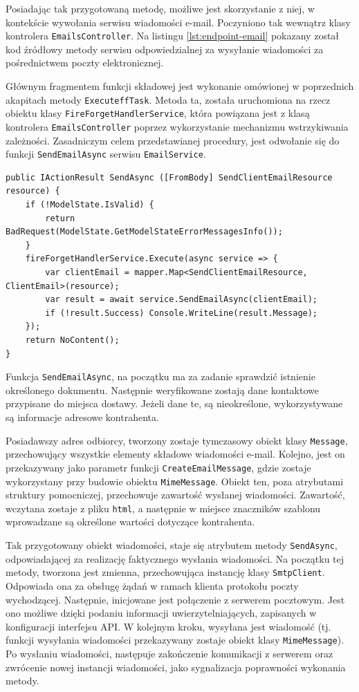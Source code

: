Posiadając tak przygotowaną metodę, możliwe jest skorzystanie z niej, w kontekście wywołania serwisu wiadomości e-mail. Poczyniono tak wewnątrz klasy kontrolera \texttt{EmailsController}. Na listingu \ref{lst:endpoint-email} pokazany został kod źródłowy metody serwisu odpowiedzialnej za wysyłanie wiadomości za pośrednictwem poczty elektronicznej.

Głównym fragmentem funkcji składowej jest wykonanie omówionej w poprzednich akapitach metody \texttt{ExecuteffTask}. Metoda ta, została uruchomiona na rzecz obiektu klasy \texttt{FireForgetHandlerService}, która powiązana jest z klasą kontrolera \texttt{EmailsController} poprzez wykorzystanie mechanizmu wstrzykiwania zależności. Zasadniczym celem przedstawianej procedury, jest odwołanie się do funkcji \texttt{SendEmailAsync} serwisu \texttt{EmailService}.

\begin{lstlisting}[label=lst:endpoint-email,caption=Kod punktu końcowego odpowiedzialnego za wysyłanie wiadomości e-mail, captionpos=b,basicstyle=\footnotesize\ttfamily,style=sharpcstyle,language={[Sharp]C}]
public IActionResult SendAsync ([FromBody] SendClientEmailResource resource) {
	if (!ModelState.IsValid) {
		return BadRequest(ModelState.GetModelStateErrorMessagesInfo());
	}
	fireForgetHandlerService.Execute(async service => {
		var clientEmail = mapper.Map<SendClientEmailResource, ClientEmail>(resource);
		var result = await service.SendEmailAsync(clientEmail);
		if (!result.Success) Console.WriteLine(result.Message);
	});
	return NoContent();
}
\end{lstlisting}

Funkcja \texttt{SendEmailAsync}, na początku ma za zadanie sprawdzić istnienie określonego dokumentu. Następnie weryfikowane zostają dane kontaktowe przypisane do miejsca dostawy. Jeżeli dane te, są nieokreślone, wykorzystywane są informacje adresowe kontrahenta.

Posiadawszy adres odbiorcy, tworzony zostaje tymczasowy obiekt klasy \texttt{Message}, przechowujący wszystkie elementy składowe wiadomości e-mail. Kolejno, jest on przekazywany jako parametr funkcji \texttt{CreateEmailMessage}, gdzie zostaje wykorzystany przy budowie obiektu \texttt{MimeMessage}. Obiekt ten, poza atrybutami struktury pomocniczej, przechowuje zawartość wysłanej wiadomości. Zawartość, wczytana zostaje z pliku \texttt{html}, a następnie w miejsce znaczników szablonu wprowadzane są określone wartości dotyczące kontrahenta.

Tak przygotowany obiekt wiadomości, staje się atrybutem metody \texttt{SendAsync}, odpowiadającej za realizację faktycznego wysłania wiadomości. Na początku tej metody, tworzona jest zmienna, przechowująca instancję klasy \texttt{SmtpClient}. Odpowiada ona za obsługę żądań w ramach klienta protokołu poczty wychodzącej. Następnie, inicjowane jest połączenie z serwerem pocztowym. Jest ono możliwe dzięki podaniu informacji uwierzytelniających, zapisanych w konfiguracji interfejsu API. W kolejnym kroku, wysyłana jest wiadomość (tj. funkcji wysyłania wiadomości przekazywany zostaje obiekt klasy \texttt{MimeMessage}). Po wysłaniu wiadomości, następuje zakończenie komunikacji z serwerem oraz zwrócenie nowej instancji wiadomości, jako sygnalizacja poprawności wykonania metody.

